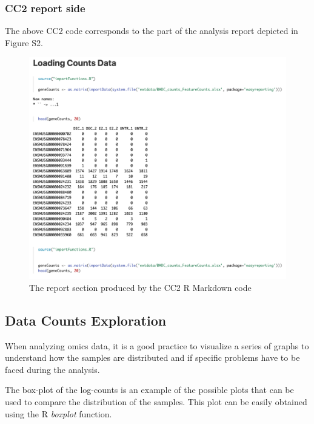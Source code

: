 \documentclass[
]{article}
\begin{document}
\hypertarget{cc2-report-side}{%
\subsubsection{CC2 report side}\label{cc2-report-side}}

The above CC2 code corresponds to the part of the analysis report
depicted in Figure S2.

\begin{figure}[ht]

{\centering \includegraphics[width=0.95\linewidth]{imgs/2} 

}

\caption{The report section produced by the CC2 R Markdown code}\label{fig:unnamed-chunk-6}
\end{figure}

\hypertarget{data-counts-exploration}{%
\subsection{Data Counts Exploration}\label{data-counts-exploration}}

When analyzing omics data, it is a good practice to visualize a series
of graphs to understand how the samples are distributed and if specific
problems have to be faced during the analysis.

The box-plot of the log-counts is an example of the possible plots that
can be used to compare the distribution of the samples. This plot can be
easily obtained using the R \emph{boxplot} function.
\end{document}
